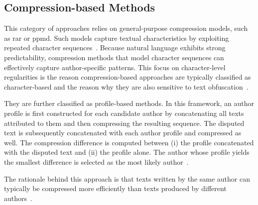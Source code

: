 \subsection{Compression-based Methods}
This category of approaches relies on general-purpose compression models, such as \ac{rar} or \ac{ppmd}. %
Such models capture textual characteristics by exploiting repeated character sequences~\citep{stamatatos_survey_2009,neal_surveying_2018}. 
Because natural language exhibits strong predictability, compression methods that model character sequences can effectively capture author-specific patterns.
This focus on character-level regularities is the reason compression-based approaches are typically classified as character-based and the reason why they are also sensitive to text obfuscation~\citep{bevendorff_divergence_based_2020}.

They are further classified as profile-based methods. In this framework, an author profile is first constructed for each candidate author by concatenating all texts attributed to them and then compressing the resulting sequence. 
The disputed text is subsequently concatenated with each author profile and compressed as well. 
The compression difference is computed between (i) the profile concatenated with the disputed text and (ii) the profile alone.  
The author whose profile yields the smallest difference is selected as the most likely author~\citep{stamatatos_survey_2009,elmanarelbouanani_authorship_2014,neal_surveying_2018}.

The rationale behind this approach is that texts written by the same author can typically be compressed more efficiently than texts produced by different authors~\citep{stamatatos_survey_2009,elmanarelbouanani_authorship_2014}.


